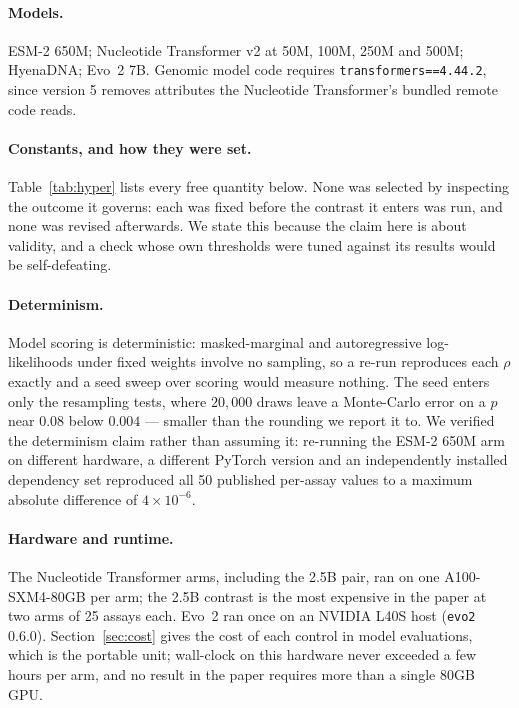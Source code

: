 \documentclass[11pt]{article}
\begin{document}
\paragraph{Models.} ESM-2 650M; Nucleotide Transformer v2 at 50M, 100M, 250M and
500M; HyenaDNA; Evo~2 7B. Genomic model code requires
\texttt{transformers==4.44.2}, since version 5 removes attributes the Nucleotide
Transformer's bundled remote code reads.

\paragraph{Constants, and how they were set.} Table~\ref{tab:hyper} lists every
free quantity below. None was selected by inspecting the outcome it
governs: each was fixed before the contrast it enters was run, and none was
revised afterwards. We state this because the claim here is about validity, and a
check whose own thresholds were tuned against its results would be
self-defeating.


\paragraph{Determinism.} Model scoring is deterministic: masked-marginal and
autoregressive log-likelihoods under fixed weights involve no sampling, so a
re-run reproduces each $\rho$ exactly and a seed sweep over scoring would measure
nothing. The seed enters only the resampling tests, where $20{,}000$ draws leave a
Monte-Carlo error on a $p$ near $0.08$ below $0.004$ --- smaller than the
rounding we report it to. We verified the determinism claim rather than assuming
it: re-running the ESM-2 650M arm on different hardware, a different PyTorch
version and an independently installed dependency set reproduced all 50 published
per-assay values to a maximum absolute difference of $4\times10^{-6}$.

\paragraph{Hardware and runtime.} The Nucleotide Transformer arms, including the
2.5B pair, ran on one A100-SXM4-80GB per arm; the 2.5B contrast is the most
expensive in the paper at two arms of 25 assays each. Evo~2 ran once on an NVIDIA
L40S host (\texttt{evo2} 0.6.0). Section~\ref{sec:cost} gives the cost of each
control in model evaluations, which is the portable unit; wall-clock on this
hardware never exceeded a few hours per arm, and no result in the paper requires
more than a single 80GB GPU.
\end{document}
